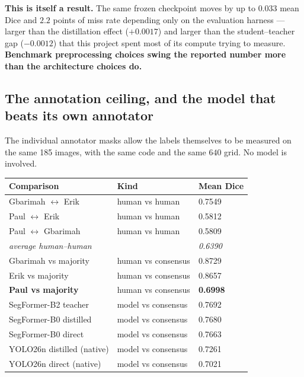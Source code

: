\documentclass[11pt]{article}
\begin{document}
\begin{keybox}
\textbf{This is itself a result.} The same frozen checkpoint moves by up to $0.033$ mean Dice and
$2.2$ points of miss rate depending only on the evaluation harness --- larger than the
distillation effect ($+0.0017$) and larger than the student--teacher gap ($-0.0012$) that this
project spent most of its compute trying to measure. \textbf{Benchmark preprocessing choices swing
the reported number more than the architecture choices do.}
\end{keybox}

\subsection{The annotation ceiling, and the model that beats its own annotator}
\label{sec:ceiling}

The individual annotator masks allow the labels themselves to be measured on the same 185 images,
with the same code and the same $640$ grid. No model is involved.

\begin{center}\small
\begin{tabular}{>{\raggedright\arraybackslash}p{6.4cm} >{\raggedright\arraybackslash}p{4.6cm} M}
\toprule
\textbf{Comparison} & \textbf{Kind} & \textbf{Mean Dice} \\
\midrule
Gbarimah $\leftrightarrow$ Erik      & human vs human     & 0.7549 \\
Paul $\leftrightarrow$ Erik          & human vs human     & 0.5812 \\
Paul $\leftrightarrow$ Gbarimah      & human vs human     & 0.5809 \\
\quad \textit{average human--human}  &                    & \textit{0.6390} \\
\addlinespace
Gbarimah vs majority                 & human vs consensus & 0.8729 \\
Erik vs majority                     & human vs consensus & 0.8657 \\
\textbf{Paul vs majority}            & human vs consensus & \textbf{0.6998} \\
\addlinespace
SegFormer-B2 teacher                 & model vs consensus & 0.7692 \\
SegFormer-B0 distilled               & model vs consensus & 0.7680 \\
SegFormer-B0 direct                  & model vs consensus & 0.7663 \\
YOLO26n distilled (native)           & model vs consensus & 0.7261 \\
YOLO26n direct (native)              & model vs consensus & 0.7021 \\
\bottomrule
\end{tabular}
\end{center}
\end{document}
